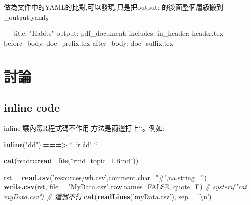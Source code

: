 \documentclass[]{book}
\newenvironment{Shaded}{\begin{snugshade}}{\end{snugshade}}
\newcommand{\AttributeTok}[1]{\textcolor[rgb]{0.77,0.63,0.00}{#1}}
\newcommand{\CharTok}[1]{\textcolor[rgb]{0.31,0.60,0.02}{#1}}
\newcommand{\CommentTok}[1]{\textcolor[rgb]{0.56,0.35,0.01}{\textit{#1}}}
\newcommand{\DataTypeTok}[1]{\textcolor[rgb]{0.13,0.29,0.53}{#1}}
\newcommand{\ErrorTok}[1]{\textcolor[rgb]{0.64,0.00,0.00}{\textbf{#1}}}
\newcommand{\FunctionTok}[1]{\textcolor[rgb]{0.00,0.00,0.00}{#1}}
\newcommand{\KeywordTok}[1]{\textcolor[rgb]{0.13,0.29,0.53}{\textbf{#1}}}
\newcommand{\NormalTok}[1]{#1}
\newcommand{\OperatorTok}[1]{\textcolor[rgb]{0.81,0.36,0.00}{\textbf{#1}}}
\newcommand{\OtherTok}[1]{\textcolor[rgb]{0.56,0.35,0.01}{#1}}
\newcommand{\StringTok}[1]{\textcolor[rgb]{0.31,0.60,0.02}{#1}}
\theoremstyle{definition}
\theoremstyle{definition}
\theoremstyle{definition}
\theoremstyle{remark}
\begin{document}
做為文件中的YAML的比對,可以發現,只是把output:
的後面整個層級搬到\_output.yaml。

\begin{Shaded}
\begin{Highlighting}[]
\OtherTok{---}
\FunctionTok{title:}\AttributeTok{ }\StringTok{"Habits"}
\FunctionTok{output:}
  \FunctionTok{pdf_document:}
    \FunctionTok{includes:}
      \FunctionTok{in_header:}\AttributeTok{ header.tex}
      \FunctionTok{before_body:}\AttributeTok{ doc_prefix.tex}
      \FunctionTok{after_body:}\AttributeTok{ doc_suffix.tex}
\OtherTok{---}
\end{Highlighting}
\end{Shaded}

\section{討論}

\hypertarget{inline-code}{%
\subsection{inline code}\label{inline-code}}

inline 讓內籤R程式碼不作用:方法是兩邊打上``。例如:

\begin{Shaded}
\begin{Highlighting}[]
\KeywordTok{inline}\NormalTok{(}\StringTok{"dd"}\NormalTok{)}
\OperatorTok{==}\ErrorTok{=>}\StringTok{  ``} \StringTok{`}\DataTypeTok{r dd}\StringTok{`} \StringTok{``}
\end{Highlighting}
\end{Shaded}

\begin{Shaded}
\begin{Highlighting}[]
\KeywordTok{cat}\NormalTok{(readr}\OperatorTok{::}\KeywordTok{read_file}\NormalTok{(}\StringTok{"rmd_topic_1.Rmd"}\NormalTok{))}
\end{Highlighting}
\end{Shaded}

\begin{Shaded}
\begin{Highlighting}[]
\NormalTok{rst =}\StringTok{ }\KeywordTok{read.csv}\NormalTok{(}\StringTok{'resources/wh.csv'}\NormalTok{,}\DataTypeTok{comment.char=}\StringTok{"#"}\NormalTok{,}\DataTypeTok{na.string=}\StringTok{'.'}\NormalTok{)}
\KeywordTok{write.csv}\NormalTok{(rst, }\DataTypeTok{file =} \StringTok{"MyData.csv"}\NormalTok{,}\DataTypeTok{row.names=}\OtherTok{FALSE}\NormalTok{, }\DataTypeTok{quote=}\NormalTok{F)}
\CommentTok{# system("cat myData.csv") # 這個不行}
\KeywordTok{cat}\NormalTok{(}\KeywordTok{readLines}\NormalTok{(}\StringTok{'myData.csv'}\NormalTok{), }\DataTypeTok{sep =} \StringTok{'}\CharTok{\textbackslash{}n}\StringTok{'}\NormalTok{)}
\end{Highlighting}
\end{Shaded}
\end{document}
